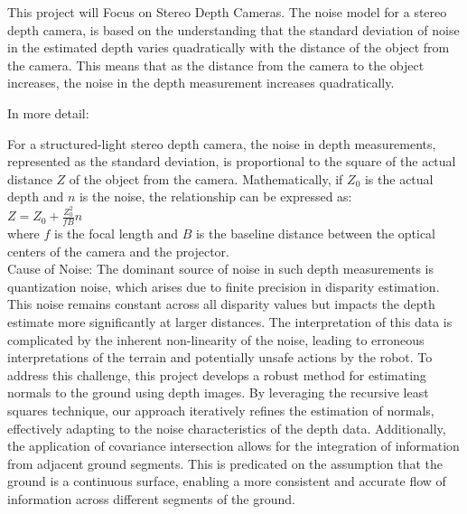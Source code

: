\documentclass[12pt,a4paper,oneside,onecolumn]{book}
\begin{document}


This project will Focus on Stereo Depth Cameras.
The noise model for a stereo depth camera, is based on the understanding that the standard deviation of noise in the estimated depth varies quadratically with the distance of the object from the camera. This means that as the distance from the camera to the object increases, the noise in the depth measurement increases quadratically. 

In more detail: 

    For a structured-light stereo depth camera, the noise in depth measurements, represented as the standard deviation, is proportional to the square of the actual distance $Z$ of the object from the camera. Mathematically, if $Z_0$  is the actual depth and $n$ is the noise, the relationship can be expressed as: 
\\[1em]
$Z=Z_0+\frac{Z_0^2}{fB}n$
\\[1em]
where $f$ is the focal length and $B$ is the baseline distance between the optical centers of the camera and the projector. 
\\[1em]
Cause of Noise: The dominant source of noise in such depth measurements is quantization noise, which arises due to finite precision in disparity estimation. This noise remains constant across all disparity values but impacts the depth estimate more significantly at larger distances. 
The interpretation of this data is complicated by the inherent non-linearity of the noise, leading to erroneous interpretations of the terrain and potentially unsafe actions by the robot. 
To address this challenge, this project develops a robust method for estimating normals to the ground using depth images. By leveraging the recursive least squares technique, our approach iteratively refines the estimation of normals, effectively adapting to the noise characteristics of the depth data. Additionally, the application of covariance intersection allows for the integration of information from adjacent ground segments. This is predicated on the assumption that the ground is a continuous surface, enabling a more consistent and accurate flow of information across different segments of the ground. 



 


\end{document}

